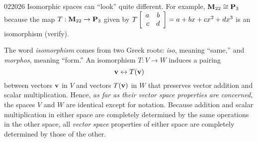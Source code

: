 \begin{example}{}{022026}
Isomorphic spaces can ``look'' quite different. For example, $\textbf{M}_{22} \cong \textbf{P}_{3}$ because the map $T : \textbf{M}_{22} \to \textbf{P}_{3}$ given by $T\left[ \begin{array}{rr}
a & b \\
c & d
\end{array} \right] = a + bx + cx^2 + dx^3$ is an isomorphism (verify).
\end{example}

The word \textit{isomorphism} comes from two Greek roots: \textit{iso}, meaning ``same,'' and \textit{morphos}, meaning ``form.'' An isomorphism $T : V \to W$ induces a pairing
\begin{equation*}
\textbf{v} \leftrightarrow T(\textbf{v})
\end{equation*}
between vectors $\textbf{v}$ in $V$ and vectors $T(\textbf{v})$ in $W$ that preserves vector addition and scalar multiplication. Hence, \textit{as far as their vector space properties are concerned}, the spaces $V$ and $W$ are identical except for notation. Because addition and scalar multiplication in either space are completely determined by the same operations in the other space, all \textit{vector space} properties of either space are completely determined by those of the other.


